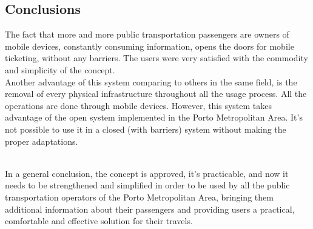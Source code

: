 \documentclass[9pt,a4paper]{extarticle}
\begin{document}
\begin{multicols}{2}
\section{Conclusions}\label{sec:conclui}

The fact that more and more public transportation passengers are owners of mobile devices, constantly consuming information, opens the doors for mobile ticketing, without any barriers. The users were very satisfied with the commodity and simplicity of the concept.
\\Another advantage of this system comparing to others in the same field, is the removal of every physical infrastructure throughout all the usage process. All the operations are done through mobile devices. However, this system takes advantage of the open system implemented in the Porto Metropolitan Area. It’s not possible to use it in a closed (with barriers) system without making the proper adaptations.

~\\In a general conclusion, the concept is approved, it’s practicable, and now it needs to be strengthened and simplified in order to be used by all the public transportation operators of the Porto Metropolitan Area, bringing them additional information about their passengers and providing users a practical, comfortable and effective solution for their travels.



\end{multicols}
\end{document}
